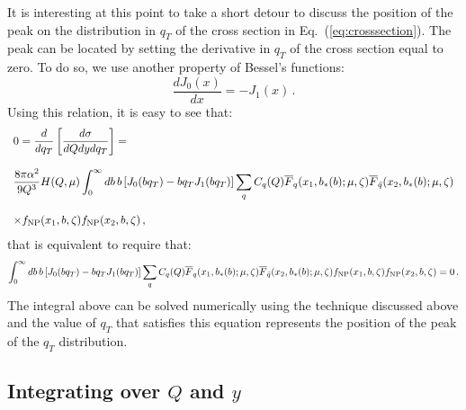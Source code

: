 \documentclass[10pt,a4paper]{article}
\begin{document}
It is interesting at this point to take a short detour to discuss the
position of the peak on the distribution in $q_T$ of the cross section
in Eq.~(\ref{eq:crosssection}). The peak can be located by setting the
derivative in $q_T$ of the cross section equal to zero. To do so, we
use another property of Bessel's functions:
\begin{equation}
\frac{dJ_0(x)}{dx} = -J_1(x)\,.
\end{equation}
Using this relation, it is easy to see that:
\begin{equation}
\begin{array}{l}
\displaystyle 0 = \frac{d}{dq_T}  \left[\frac{d\sigma}{dQ dy dq_T}\right]
  =\\
\\
\displaystyle  \frac{8\pi\alpha^2}{9 Q^3} H(Q,\mu) 
  \int_0^\infty db\,b \left[J_0(bq_T) -bq_TJ_1(bq_T)\right] 
\sum_q C_q(Q)\overline{F}_q(x_1,b_*(b);\mu,\zeta)
  \overline{F}_{\bar{q}}(x_2,b_*(b);\mu,\zeta)\\
\\
\displaystyle \times f_{\rm NP}(x_1,b,\zeta)
  f_{\rm NP}(x_2,b,\zeta)\,,
\end{array}
\end{equation}
that is equivalent to require that:
\begin{equation}
  \int_0^\infty db\,b \left[J_0(bq_T) -bq_TJ_1(bq_T)\right] 
  \sum_q C_q(Q)\overline{F}_q(x_1,b_*(b);\mu,\zeta) \overline{F}_{\bar{q}}(x_2,b_*(b);\mu,\zeta) f_{\rm NP}(x_1,b,\zeta)
  f_{\rm NP}(x_2,b,\zeta) = 0\,.
\end{equation}
The integral above can be solved numerically using the technique
discussed above and the value of $q_T$ that satisfies this equation
represents the position of the peak of the $q_T$ distribution.

\subsection{Integrating over $Q$ and $y$}\label{sec:QyInt}
\end{document}

